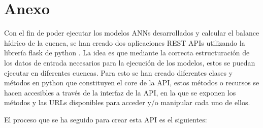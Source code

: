 \chapter{Anexo}
\label{Desarrollo}
Con el fin de poder ejecutar los modelos ANNs desarrollados y calcular el balance hídrico de la cuenca, 
se han creado dos aplicaciones REST APIs utilizando la librería flask de python \cite{flask}. La idea 
es que mediante la correcta estructuración de los datos de entrada necesarios para la ejecución de los modelos, estos se puedan ejecutar en diferentes 
cuencas.
Para esto se han creado diferentes clases y métodos en python que constituyen el core de la API, estos métodos o recursos se hacen 
accesibles a través de la interfaz de la API, en la que se exponen los métodos y las URLs disponibles para acceder 
y/o manipular cada uno de ellos.


El proceso que se ha seguido para crear esta API es el siguientes:


